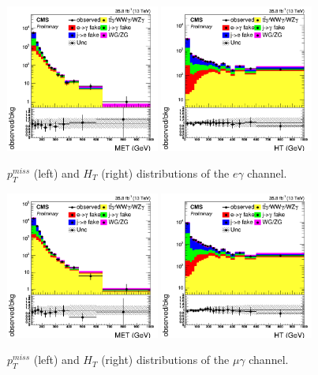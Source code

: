 \documentclass[thesis.tex]{subfiles}
\renewcommand\_{\textunderscore\allowbreak}
\begin{document}
\begin{figure}[hbtp]
  \centering
    \includegraphics[width=0.45\textwidth]{Figures/VALID_egamma_2016ReMiniAOD_met_TT.png}
    \includegraphics[width=0.45\textwidth]{Figures/VALID_egamma_2016ReMiniAOD_ht_TT.png}
  \caption{$p_T^{miss}$ (left) and $H_T$ (right) distributions of the $e\gamma$ channel.}
    \label{fig:ttgvalidationeg}
\end{figure}
\begin{figure}[hbtp]
  \centering
    \includegraphics[width=0.45\textwidth]{Figures/VALID_mg_2016ReMiniAOD_met_TT.png}
    \includegraphics[width=0.45\textwidth]{Figures/VALID_mg_2016ReMiniAOD_ht_TT.png}
  \caption{$p_T^{miss}$ (left) and $H_T$ (right) distributions of the $\mu\gamma$ channel.}
    \label{fig:ttgvalidationmg}
\end{figure}
\end{document}
